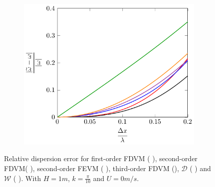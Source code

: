 \begin{figure}
	\begin{subfigure}{0.5\textwidth}
		\includegraphics[width=\textwidth]{./chp4/figures/Dispu0khShallz.pdf}
	\end{subfigure}
	\caption{Relative dispersion error for first-order FDVM ({\color{green!60!black} \solidrule}), second-order FDVM({\color{red} \solidrule}), second-order FEVM ({\color{blue} \solidrule}), third-order FDVM ({\solidrule}), $\mathcal{D}$ ({\color{violet!80!white} \solidrule}) and $\mathcal{W}$ ({\color{orange} \solidrule}). With $H = 1m$, $k = \frac{\pi}{10}$ and $U = 0 m/s$.}
	\label{fig:Dispu0Shall}
\end{figure}

